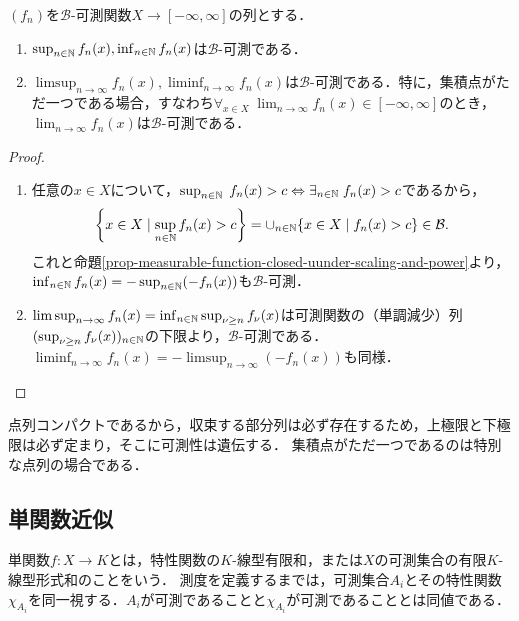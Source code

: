 \documentclass[uplatex, dvipdfmx]{jsreport}
\renewcommand{\B}{\mathcal{B}}
\begin{document}
\begin{proposition}[極限構成]\label{prop-limit-of-sequence-of-measurable-function}
    $(f_n)$を$\B$-可測関数$X\to[-\infty,\infty]$の列とする．
    \begin{enumerate}
        \item $\sup_{n\in\mathbb{N}}f_n(x),\inf_{n\in\mathbb{N}}f_n(x)$は$\B$-可測である．
        \item $\limsup_{n\to\infty}f_n(x),\liminf_{n\to\infty}f_n(x)$は$\B$-可測である．特に，集積点がただ一つである場合，すなわち$\forall_{x\in X}\;\lim_{n\to\infty}f_n(x)\in[-\infty,\infty]$のとき，$\lim_{n\to\infty}f_n(x)$は$\B$-可測である．
    \end{enumerate}
\end{proposition}
\begin{proof}\mbox{}
    \begin{enumerate}
        \item 任意の$x\in X$について，$\sup_{n\in\mathbb{N}}\;f_n(x)>c\Leftrightarrow\exists_{n\in\mathbb{N}}\;f_n(x)>c$であるから，
        \[\Brace{x\in X\mid\sup_{n\in\N}f_n(x)>c}=\cup_{n\in\N}\{x\in X\mid f_n(x)>c\}\in\B.\]
        これと命題\ref{prop-measurable-function-closed-uunder-scaling-and-power}より，$\inf_{n\in\mathbb{N}}f_n(x)=-\sup_{n\in\mathbb{N}}(-f_n(x))$も$\B$-可測．
        \item 
        $\limsup_{n\to\infty}f_n(x)=\inf_{n\in\mathbb{N}}\sup_{\nu\ge n}f_\nu(x)$は可測関数の（単調減少）列$(\sup_{\nu\ge n}f_\nu(x))_{n\in\mathbb{N}}$の下限より，$\B$-可測である．
        $\liminf_{n\to\infty}f_n(x)=-\limsup_{n\to\infty}(-f_n(x))$も同様．
    \end{enumerate}
\end{proof}
\begin{remarks}
    点列コンパクトであるから，収束する部分列は必ず存在するため，上極限と下極限は必ず定まり，そこに可測性は遺伝する．
    集積点がただ一つであるのは特別な点列の場合である．
\end{remarks}

\subsection{単関数近似}

\begin{tcolorbox}[colframe=ForestGreen, colback=ForestGreen!10!white,breakable,colbacktitle=ForestGreen!40!white,coltitle=black,fonttitle=\bfseries\sffamily,
title=]
    単関数$f:X\to K$とは，特性関数の$K$-線型有限和，または$X$の可測集合の有限$K$-線型形式和のことをいう．
    測度を定義するまでは，可測集合$A_i$とその特性関数$\chi_{A_i}$を同一視する．$A_i$が可測であることと$\chi_{A_i}$が可測であることとは同値である．
\end{tcolorbox}
\end{document}
